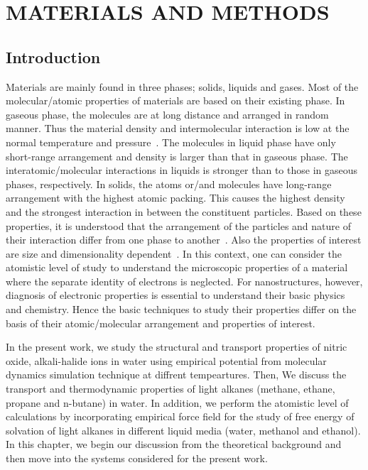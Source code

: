\chapter{MATERIALS AND METHODS} \label{chap:3}
\def\etal{{\it et al.}\/}
\section{Introduction}
\begin{sloppypar}
Materials are mainly found in three phases; solids, liquids and gases. Most of the molecular/atomic properties of materials are based on their existing phase. In gaseous phase, the molecules are at long distance and arranged in random manner. Thus the material density and intermolecular interaction is low at the normal temperature and pressure~\citep{Frenkel2002}. The molecules in liquid phase have only short-range arrangement 
and density is larger than that in gaseous phase. The interatomic/molecular interactions in liquids is stronger than to those in gaseous phases, respectively. In solids, the atoms or/and molecules have long-range arrangement with the highest atomic packing. This causes the highest density and the strongest interaction in between the constituent particles. Based on these properties, it is understood that the arrangement of the particles and nature of their interaction differ from one phase to another~\citep{Hansen2006}. Also the properties of interest are size and dimensionality dependent~\citep{Rao2009}. In this context, one can consider the atomistic level of study to understand the microscopic properties of a material where the separate identity of electrons is neglected. For nanostructures, however, diagnosis of electronic properties is essential to understand their basic physics and chemistry. Hence the basic techniques to study their properties differ on the basis of their atomic/molecular arrangement and properties of interest.
\end{sloppypar}

In the present work, we study the structural and transport properties of nitric oxide, alkali-halide ions in water  using empirical potential from molecular dynamics simulation technique at diffrent tempeartures. Then, We discuss the transport and thermodynamic properties of light alkanes (methane, ethane, propane and n-butane) in water. In addition, we perform  the atomistic level of calculations by incorporating empirical force field for the study of free energy of solvation of light alkanes in different liquid media (water, methanol and ethanol). In this chapter, we begin our discussion from the theoretical background and then move into the systems considered for the present work. 

